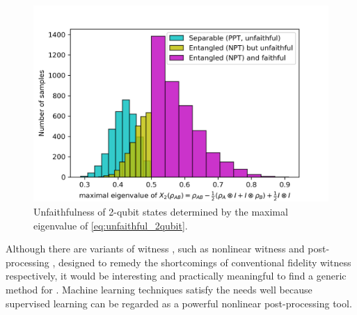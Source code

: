 \documentclass[
reprint,
aps,
pra,
floatfix,
]{revtex4-2}
\theoremstyle{plain}
\theoremstyle{definition}
\begin{document}
\begin{figure}[!ht]
	\centering
	\includegraphics[width=.9\linewidth]{./Code/faithfulness_2_qubit.png}
	\caption{Unfaithfulness of 2-qubit states determined by the maximal eigenvalue of \cref{eq:unfaithful_2qubit}.}
	\label{fig:unfaithfulness}
\end{figure}

Although there are variants of witness \cite{zhouEntanglementDetectionCoherent2020}, such as nonlinear witness \cite{guhneNonlinearEntanglementWitnesses2006} and post-processing \cite{zhanDetectingEntanglementUnfaithful2021}, designed to remedy the shortcomings of conventional fidelity witness respectively, 
it would be interesting and practically meaningful to find a generic method for .
Machine learning techniques satisfy the needs well because supervised learning can be regarded as a powerful nonlinear post-processing tool.
\end{document}
